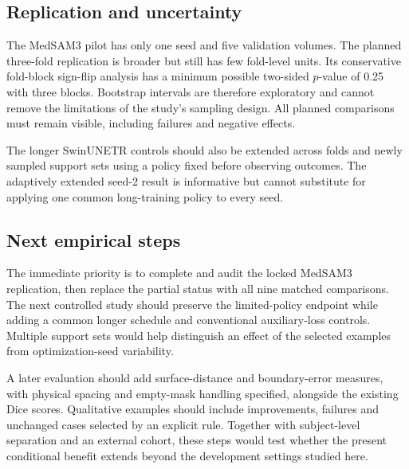 \subsection{Replication and uncertainty}
The MedSAM3 pilot has only one seed and five validation volumes. The planned three-fold replication is broader but still has few fold-level units. Its conservative fold-block sign-flip analysis has a minimum possible two-sided $p$-value of 0.25 with three blocks. Bootstrap intervals are therefore exploratory and cannot remove the limitations of the study's sampling design. All planned comparisons must remain visible, including failures and negative effects.

The longer SwinUNETR controls should also be extended across folds and newly sampled support sets using a policy fixed before observing outcomes. The adaptively extended seed-2 result is informative but cannot substitute for applying one common long-training policy to every seed.

\subsection{Next empirical steps}
The immediate priority is to complete and audit the locked MedSAM3 replication, then replace the partial status with all nine matched comparisons. The next controlled study should preserve the limited-policy endpoint while adding a common longer schedule and conventional auxiliary-loss controls. Multiple support sets would help distinguish an effect of the selected examples from optimization-seed variability.

A later evaluation should add surface-distance and boundary-error measures, with physical spacing and empty-mask handling specified, alongside the existing Dice scores. Qualitative examples should include improvements, failures and unchanged cases selected by an explicit rule. Together with subject-level separation and an external cohort, these steps would test whether the present conditional benefit extends beyond the development settings studied here.
